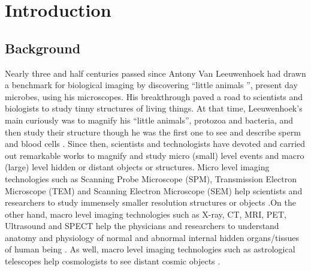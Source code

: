 
\chapter{Introduction} %

\label{Chapter1} %


\newcommand{\keyword}[1]{\textbf{#1}}
\newcommand{\tabhead}[1]{\textbf{#1}}
\newcommand{\code}[1]{\texttt{#1}}
\newcommand{\file}[1]{\texttt{\bfseries#1}}
\newcommand{\option}[1]{\texttt{\itshape#1}}


\section{Background}

\setlength{\parindent}{10ex} Nearly three and half centuries passed since Antony Van Leeuwenhoek had drawn a benchmark for biological imaging by discovering “little animals ”, present day microbes, using his microscopes. His breakthrough paved a road to scientists and biologists to study tinny structures of living things. At that time, Leeuwenhoek’s main curiously was to magnify his “little animals”, protozoa and bacteria, and then study their structure though he was the first one to see and describe sperm and blood cells \cite{Croft2006,Dobell1960}. Since then, scientists and technologists have devoted and carried out remarkable works to magnify and study micro (small) level events and macro (large) level hidden or distant objects or structures. Micro level imaging technologies such as Scanning Probe Microscope (SPM), Transmission Electron Microscope (TEM) and Scanning Electron Microscope (SEM) help scientists and researchers to study immensely smaller resolution structures or objects \cite{Croft2006}.On the other hand, macro level imaging technologies such as X-ray, CT, MRI, PET, Ultrasound and SPECT help the physicians and researchers to understand anatomy and physiology of normal and abnormal internal hidden organs/tissues of human being \cite {Dhawan2011}. As well, macro level imaging technologies such as astrological telescopes help cosmologists to see distant cosmic objects \cite{Russ2016}.

